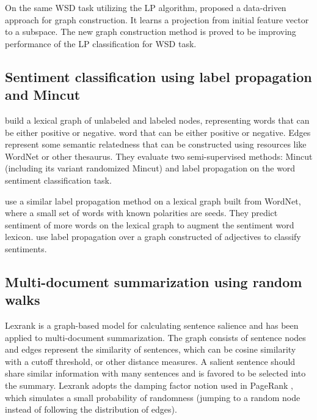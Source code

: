  On the same WSD task utilizing the LP algorithm, \cite{alex}
  proposed a data-driven approach for graph construction. It learns a projection
  from initial feature vector to a subspace. The new graph construction method
  is proved to be improving performance of the LP
  classification for WSD task.

\subsection*{Sentiment classification using label propagation and Mincut}

 \cite{rao} build a lexical graph  of unlabeled and
 labeled nodes, representing words that can be either positive or negative.
 word that can be either positive or negative. Edges represent some
 semantic relatedness that can be constructed using resources like WordNet or
 other thesaurus. They evaluate two semi-supervised methods: Mincut (including
 its variant randomized Mincut) and label propagation on the word sentiment
 classification task. 

 \cite{Blair08} use a similar label propagation method on a
 lexical graph built from WordNet, where a small set of words with known
 polarities are seeds. They predict sentiment of more words on the lexical graph
 to augment the sentiment word lexicon. \cite{brody} use
 label propagation over a graph constructed of adjectives to classify
 sentiments.


 \subsection*{Multi-document summarization using random walks}

 Lexrank \cite{lexrank} is a graph-based model for calculating sentence salience
 and has been applied to multi-document summarization. The graph consists of sentence
 nodes and edges represent the similarity of sentences, 
which can be cosine similarity with a cutoff threshold, or other distance
 measures. A salient sentence should share similar information with many
 sentences and is favored to be selected into the summary. Lexrank adopts the
 damping factor notion used in PageRank \cite{pagerank}, which simulates a small
 probability of randomness (jumping to a random node instead of following the
 distribution of edges).
